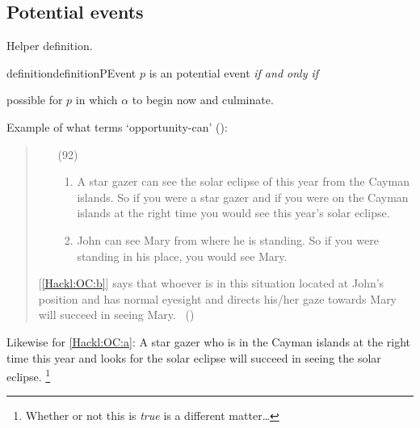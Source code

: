 \subsection{Potential events}
\label{sec:potential-events}

\begin{note}
  Helper definition.

  \begin{restatable}{definition}{definitionPEvent}
    \(p\) is an potential event \emph{if and only if}

    possible for \(p\) in which \(\alpha\) to begin now and culminate.
  \end{restatable}

    Example of what \textcite{Hackl:1998tt} terms `opportunity-can' (\citeyear[14]{Hackl:1998tt}):

  \begin{quote}
    \begin{enumerate}
    \item[(92)]
      \begin{enumerate}[label=\alph*., ref=(\alph*)]
      \item
        \label{Hackl:OC:a}
        A star gazer can see the solar eclipse of this year from the Cayman islands.\newline
        So if you were a star gazer and if you were on the Cayman islands at the right time you would see this year's solar eclipse.
      \item
        \label{Hackl:OC:b}
        John can see Mary from where he is standing.\newline
        So if you were standing in his place, you would see Mary.
      \end{enumerate}
    \end{enumerate}

    [\ref{Hackl:OC:b}] says that whoever is in this situation located at John's position and has normal eyesight and directs his/her gaze towards Mary will succeed in seeing Mary.%
    \mbox{ }\hfill\mbox{(\citeyear[39]{Hackl:1998tt})}
  \end{quote}
  Likewise for \ref{Hackl:OC:a}:
  A star gazer who is in the Cayman islands at the right time this year and looks for the solar eclipse will succeed in seeing the solar eclipse.%
  \footnote{
    Whether or not this is \emph{true} is a different matter\dots
  }
\end{note}


